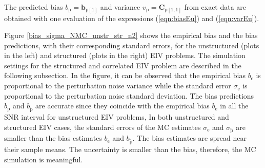 The predicted bias $b_{\mathrm{p}} = \mathbf{b}_{\mathrm{p} \left[1\right]}$ and variance $v_{\mathrm{p}} = \mathbf{C}_{\mathrm{p} \left[1,1\right]}$ from exact data are obtained with one evaluation of the expressions (\ref{eqn:biasEu}) and (\ref{eqn:varEu}). %

Figure \ref{bias_sigma_NMC_unstr_str_n2} shows the empirical bias and the bias predictions, with their corresponding standard errors, for the unstructured (plots in the left) and structured (plots in the right) EIV problems.
The simulation settings for the structured and correlated EIV problem are described in the following subsection.
In the figure, it can be observed that the empirical bias $b_\mathrm{e}$ is proportional to the perturbation noise variance while the standard error $\sigma_\mathrm{e}$ is proportional to the perturbation noise standard deviation.
The bias predictions $b_\mathrm{p}$ and $b_{\widetilde{\mathrm{p}}}$ are accurate since they coincide with the empirical bias $b_\mathrm{e}$ in all the SNR interval for unstructured EIV problems, 
In both unstructured and structured EIV cases, the standard errors of the MC estimates $\sigma_{\mathrm{e}}$ and $\sigma_{\widetilde{\mathrm{p}}}$ are smaller than the bias estimates $b_{\mathrm{e}}$ and $b_{\widetilde{\mathrm{p}}}$.
The bias estimates are spread near their sample means. 
The uncertainty is smaller than the bias, therefore, the MC simulation is meaningful.

